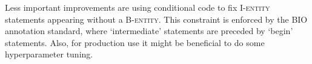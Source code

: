 Less important improvements are using conditional code to fix I-\textsc{entity} statements appearing without a B-\textsc{entity}.
This constraint is enforced by the BIO annotation standard, where `intermediate' statements are preceded by `begin' statements.
Also, for production use it might be beneficial to do some hyperparameter tuning.


